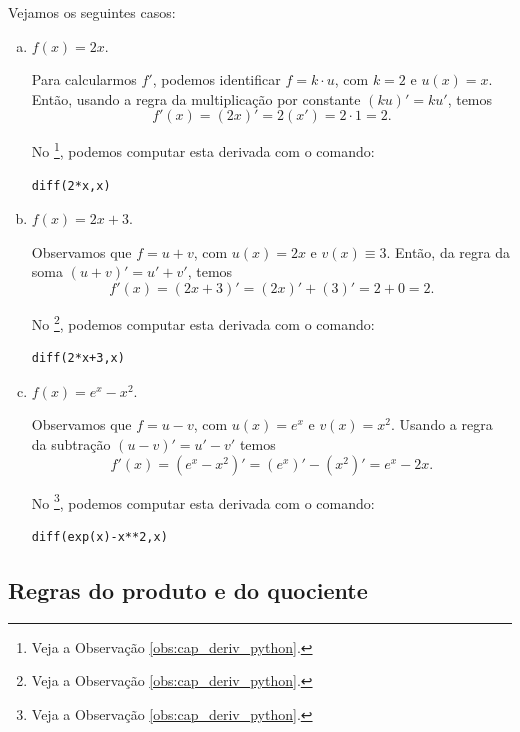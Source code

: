 \begin{ex}
  Vejamos os seguintes casos:
  \begin{enumerate}[a)]
  \item $f(x) = 2x$.

    Para calcularmos $f'$, podemos identificar $f = k\cdot u$, com $k=2$ e $u(x) = x$. Então, usando a regra da multiplicação por constante $(ku)' = ku'$, temos
    \begin{equation}
      f'(x) = (2x)' = 2(x') = 2\cdot 1 = 2.
    \end{equation}

  \ifispython
  No \sympy\footnote{Veja a Observação \ref{obs:cap_deriv_python}.}, podemos computar esta derivada com o comando:
\begin{verbatim}
diff(2*x,x)
\end{verbatim}
  \fi
    

  \item $f(x) = 2x + 3$.

    Observamos que $f = u + v$, com $u(x) = 2x$ e $v(x)\equiv 3$. Então, da regra da soma $(u+v)' = u' + v'$, temos
    \begin{equation}
      f'(x) = (2x + 3)' = (2x)' + (3)' = 2 + 0 = 2.
    \end{equation}

    \ifispython
    No \sympy\footnote{Veja a Observação \ref{obs:cap_deriv_python}.}, podemos computar esta derivada com o comando:
\begin{verbatim}
diff(2*x+3,x)
\end{verbatim}
    \fi

  \item $f(x) = e^x - x^2$.

    Observamos que $f = u-v$, com $u(x) = e^x$ e $v(x)= x^2$. Usando a regra da subtração $(u-v)' = u' - v'$ temos
    \begin{equation}
      f'(x) = (e^x - x^2)' = (e^x)' - (x^2)' = e^x - 2x.
    \end{equation}

    \ifispython
    No \sympy\footnote{Veja a Observação \ref{obs:cap_deriv_python}.}, podemos computar esta derivada com o comando:
\begin{verbatim}
diff(exp(x)-x**2,x)
\end{verbatim}
    \fi
  \end{enumerate}
\end{ex}

\subsection{Regras do produto e do quociente}

